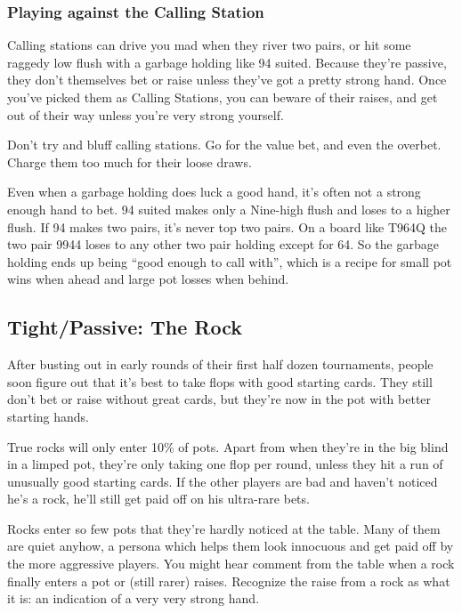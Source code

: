 \subsubsection{Playing against the Calling Station}

Calling stations can drive you mad when they river two pairs,
or hit some raggedy low flush with a garbage holding like 94 suited.
Because they're passive, they don't themselves bet or raise unless
they've got a pretty strong hand. Once you've picked them as
Calling Stations, you can beware of their raises, and get out of
their way unless you're very strong yourself.

Don't try and bluff calling stations. Go for the value bet,
and even the overbet. Charge them too much for their loose draws.

Even when a garbage holding does luck a good hand, it's often
not a strong enough hand to bet. 94 suited makes only a Nine-high
flush and loses to a higher flush. If 94 makes two pairs,
it's never top two pairs. On a board like T964Q the two pair 9944
loses to any other two pair holding except for 64. So the garbage
holding ends up being ``good enough to call with'', which is a
recipe for small pot wins when ahead and large pot losses when
behind.

\subsection{Tight/Passive: The Rock}

After busting out in early rounds of their first half dozen
tournaments, people soon figure out that it's best to take flops
with good starting cards. They still don't bet or raise without
great cards, but they're now in the pot with better starting hands.

True rocks will only enter 10\% of pots. Apart from when they're
in the big blind in a limped pot, they're only taking one
flop per round, unless they hit a run of unusually good starting
cards. If the other players are bad and haven't noticed
he's a rock, he'll still get paid off on his ultra-rare bets.


Rocks enter so few pots that they're hardly noticed
at the table. Many of them are quiet anyhow,
a persona which helps them look innocuous and get paid off by the
more aggressive players. You might hear comment from the table
when a rock finally enters a pot or (still rarer) raises. Recognize
the raise from a rock as what it is: an indication of a very very
strong hand.

